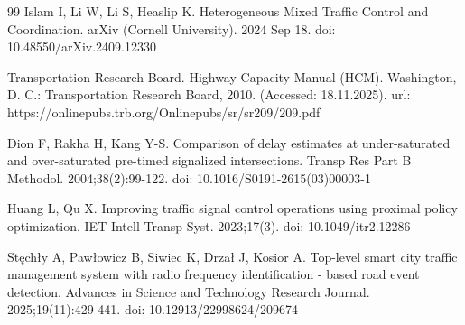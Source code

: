 \documentclass[12pt,a4paper]{article}
\begin{document}
\begin{thebibliography}{99}
Islam I, Li W, Li S, Heaslip K. Heterogeneous Mixed Traffic Control and Coordination. arXiv (Cornell University). 2024 Sep 18. doi: 10.48550/arXiv.2409.12330

Transportation Research Board. Highway Capacity Manual (HCM). Washington, D. C.: Transportation Research Board, 2010. (Accessed: 18.11.2025). url: https://onlinepubs.trb.org/Onlinepubs/sr/sr209/209.pdf

Dion F, Rakha H, Kang Y-S. Comparison of delay estimates at under-saturated and over-saturated pre-timed signalized intersections. Transp Res Part B Methodol. 2004;38(2):99-122. doi: 10.1016/S0191-2615(03)00003-1

Huang L, Qu X. Improving traffic signal control operations using proximal policy optimization. IET Intell Transp Syst. 2023;17(3). doi: 10.1049/itr2.12286

Stęchły A, Pawłowicz B, Siwiec K, Drzał J, Kosior A. Top-level smart city traffic management system with radio frequency identification - based road event detection. Advances in Science and Technology Research Journal. 2025;19(11):429-441. doi: 10.12913/22998624/209674


\end{thebibliography}
\end{document}
